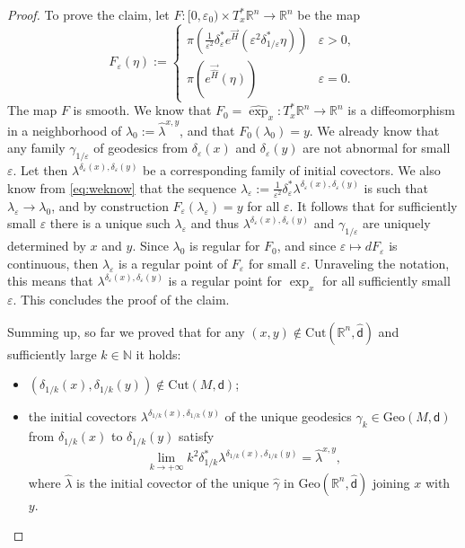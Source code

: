 \documentclass[11pt,a4paper]{article}
\theoremstyle{plain}
\theoremstyle{definition}
\theoremstyle{remark}
\numberwithin{equation}{section}
\newcommand{\R}{\mathbb{R}} %
\newcommand{\N}{\mathbb{N}} %
\newcommand{\Cut}{\mathrm{Cut}}
\newcommand{\Geo}{\mathrm{Geo}}
\newcommand{\sfd}{\mathsf d}
\begin{document}
\begin{proof}
To prove the claim, let $F : [0,\varepsilon_0)\times T_x^*\R^n \to \R^n$ be the map
\begin{equation}
F_\varepsilon(\eta) := \begin{cases} \pi \left(\frac{1}{\varepsilon^2} \delta_{\varepsilon}^* e^{\vec{H}}\left(\varepsilon^2 \delta_{1/\varepsilon}^*\eta\right)\right) & \varepsilon>0, \\
\pi\left(e^{\vec{{\hat{H}}}}(\eta)\right) & \varepsilon=0.
\end{cases}
\end{equation}
The map  $F$ is smooth. We know that $F_0 = \widehat{\exp}_x :T_x^*\R^n \to \R^n$ is a diffeomorphism in a neighborhood of $\lambda_0:=\hat{\lambda}^{x,y}$, and that $F_0(\lambda_0) = y$. We already know that any family $\gamma_{1/\varepsilon}$ of geodesics from $\delta_\varepsilon(x)$ and $\delta_\varepsilon(y)$ are not abnormal for small $\varepsilon$. Let then $\lambda^{\delta_\varepsilon(x),\delta_\varepsilon(y)}$ be a corresponding family of initial covectors. We also know from \eqref{eq:weknow} that the sequence $\lambda_\varepsilon:= \tfrac{1}{\varepsilon^2} \delta_{\varepsilon}^* \lambda^{\delta_{\varepsilon}(x),\delta_{\varepsilon}(y)}$ is such that $\lambda_\varepsilon \to \lambda_0$, and by construction $F_\varepsilon(\lambda_\varepsilon) = y$ for all $\varepsilon$. It follows that for sufficiently small $\varepsilon$ there is a unique such $\lambda_\varepsilon$ and thus $\lambda^{\delta_{\varepsilon}(x),\delta_{\varepsilon}(y)}$ and $\gamma_{1/\varepsilon}$ are uniquely determined by $x$ and $y$. Since $\lambda_0$ is regular for $F_0$, and since $\varepsilon \mapsto d F_\varepsilon$ is continuous, then $\lambda_\varepsilon$ is a regular point of $F_\varepsilon$ for small $\varepsilon$. Unraveling the notation, this means that $\lambda^{\delta_\varepsilon(x),\delta_\varepsilon(y)}$ is a regular point for $\exp_x$ for all sufficiently small $\varepsilon$. This concludes the proof of the claim.

Summing up, so far we proved that for any $(x,y)\notin \Cut(\R^n,\hat{\sfd})$ and sufficiently large $k\in \N$ it holds:
\begin{itemize}
\item $(\delta_{1/k}(x),\delta_{1/k}(y)) \notin \Cut(M,\sfd)$;
\item the initial covectors $\lambda^{\delta_{1/k}(x),\delta_{1/k}(y)}$ of the unique geodesics $\gamma_k\in\Geo(M,\sfd)$ from $\delta_{1/k}(x)$ to $\delta_{1/k}(y)$ satisfy
\begin{equation}
\lim_{k\to +\infty} k^2\delta_{1/k}^* \lambda^{\delta_{1/k}(x),\delta_{1/k}(y)} = \hat{\lambda}^{x,y},
\end{equation}
where $\hat{\lambda}$ is the initial covector of the unique $\hat{\gamma}$ in $\Geo(\R^n,\hat{\sfd})$ joining $x$ with $y$.
\end{itemize}


\end{proof}
\end{document}
